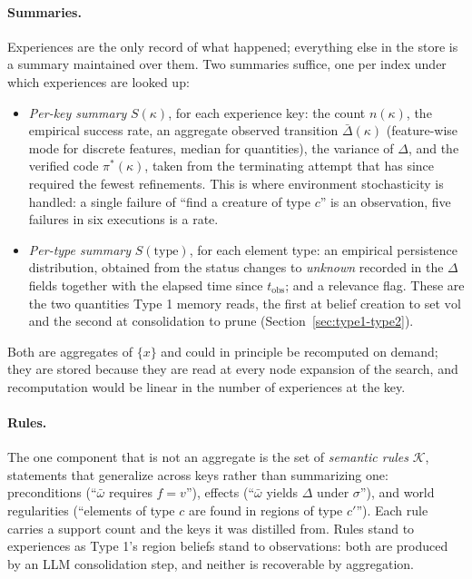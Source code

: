 \documentclass[11pt]{article}
\newcommand{\calK}{\mathcal{K}}
\newcommand{\vol}{\mathrm{vol}}
\newcommand{\type}{\mathrm{type}}
\newcommand{\tobs}{t_{\mathrm{obs}}}
\begin{document}
\paragraph{Summaries.}
Experiences are the only record of what happened; everything else in the store is a summary maintained over them. Two summaries suffice, one per index under which experiences are looked up:
\begin{itemize}[leftmargin=1.5em,itemsep=1pt]
\item \emph{Per-key summary} $S(\kappa)$, for each experience key: the count $n(\kappa)$, the empirical success rate, an aggregate observed transition $\bar\Delta(\kappa)$ (feature-wise mode for discrete features, median for quantities), the variance of $\Delta$, and the verified code $\pi^\ast(\kappa)$, taken from the terminating attempt that has since required the fewest refinements. This is where environment stochasticity is handled: a single failure of ``find a creature of type $c$'' is an observation, five failures in six executions is a rate.
\item \emph{Per-type summary} $S(\type)$, for each element type: an empirical persistence distribution, obtained from the status changes to \emph{unknown} recorded in the $\Delta$ fields together with the elapsed time since $\tobs$; and a relevance flag. These are the two quantities Type 1 memory reads, the first at belief creation to set $\vol$ and the second at consolidation to prune (Section~\ref{sec:type1-type2}).
\end{itemize}
Both are aggregates of $\{x\}$ and could in principle be recomputed on demand; they are stored because they are read at every node expansion of the search, and recomputation would be linear in the number of experiences at the key.

\paragraph{Rules.}
The one component that is not an aggregate is the set of \emph{semantic rules} $\calK$, statements that generalize across keys rather than summarizing one: preconditions (``$\bar\omega$ requires $f=v$''), effects (``$\bar\omega$ yields $\Delta$ under $\sigma$''), and world regularities (``elements of type $c$ are found in regions of type $c'$''). Each rule carries a support count and the keys it was distilled from. Rules stand to experiences as Type 1's region beliefs stand to observations: both are produced by an LLM consolidation step, and neither is recoverable by aggregation.
\end{document}
